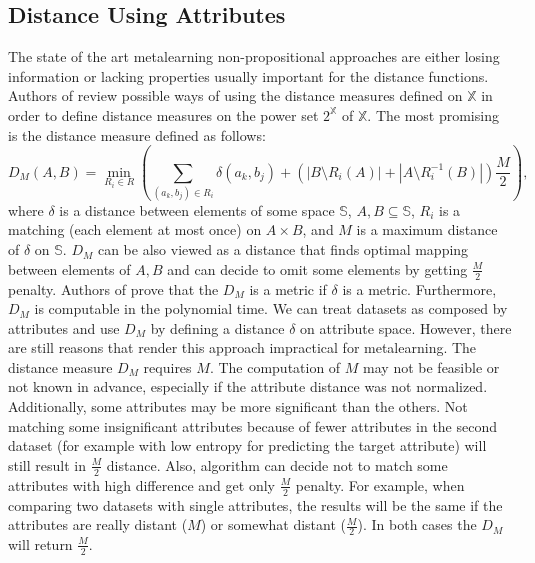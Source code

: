 \documentclass{article}
\newcommand{\attributeDistance}{\delta}
\begin{document}
\begin{refsegment}
\section{Distance Using Attributes}
\label{section:distanceUsingAttributes}
The state of the art metalearning non-propositional approaches are either losing information or lacking properties usually important for the distance functions. Authors of \cite{DistancesAndIndefiniteKernelsForTheSetsOfObjects} review possible ways of using the distance measures defined on $\mathbb{X}$ in
order to define distance measures on the power set $2^\mathbb{X}$ of $\mathbb{X}.$
The most promising is the distance measure defined as follows:
\begin{equation}
D_M(A,B) = \min_{R_i \in R}{(\sum_{(a_k, b_j) \in R_i}{\attributeDistance(a_k, b_j)}+(|B \setminus R_i(A)|+|A \setminus R_i^{-1}(B)|)\frac{M}{2})},
\end{equation}
where $\attributeDistance$ is a distance between elements of some space $\mathbb{S}$, $A,B \subseteq \mathbb{S}$, $R_i$ is a matching (each element at most once) on $A \times B$, and $M$ is a maximum distance of $\attributeDistance$ on $\mathbb{S}$. $D_M$ can be also viewed as a distance that finds optimal mapping between elements of $A,B$ and can decide to omit some elements by getting $\frac{M}{2}$ penalty.
Authors of  \cite{polynomialTimeComputableMetricBetweenPointSets} prove that the $D_M$ is a metric if $\attributeDistance$ is a metric. Furthermore, $D_M$ is computable in the polynomial time.
We can treat datasets as composed by attributes and use $D_M$ by defining a distance $\attributeDistance$ on attribute space. However, there are still reasons that render this approach impractical for metalearning.
The distance measure $D_M$ requires $M$. The computation of $M$ may not be feasible or not known in advance, especially if the attribute distance was not normalized. Additionally, some attributes may be more significant than the others. Not matching some insignificant attributes because of fewer attributes in the second dataset (for example with low entropy for predicting the target attribute) will still result in $\frac{M}{2}$ distance. Also, algorithm can decide not to match some attributes with high difference and get only $\frac{M}{2}$ penalty. For example, when comparing two datasets with single attributes, the results will be the same if the attributes are really distant ($M$) or somewhat distant ($\frac{M}{2}$). In both cases the $D_M$ will return $\frac{M}{2}$.


\end{refsegment}
\end{document}
